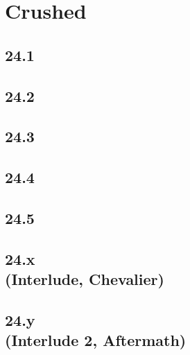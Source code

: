 \part{Crushed}

 \chapter{24.1}

 \chapter{24.2}

 \chapter{24.3}

 \chapter{24.4}

 \chapter{24.5}

 \chapter[24.x (Interlude, Chevalier)]{24.x\\(Interlude, Chevalier)}

 \chapter[24.y (Interlude 2, Aftermath)]{24.y\\(Interlude 2, Aftermath)}









